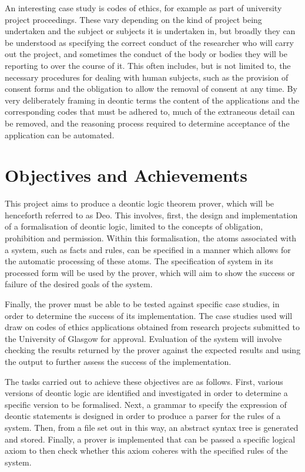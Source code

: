\documentclass{l4proj}
\begin{document}
An interesting case study is codes of ethics, for example as part of university project proceedings. These vary depending on the kind of project being undertaken and the subject or subjects it is undertaken in, but broadly they can be understood as specifying the correct conduct of the researcher who will carry out the project, and sometimes the conduct of the body or bodies they will be reporting to over the course of it. This often includes, but is not limited to, the necessary procedures for dealing with human subjects, such as the provision of consent forms and the obligation to allow the removal of consent at any time. By very deliberately framing in deontic terms the content of the applications and the corresponding codes that must be adhered to, much of the extraneous detail can be removed, and the reasoning process required to determine acceptance of the application can be automated.

\section{Objectives and Achievements} 
This project aims to produce a deontic logic theorem prover, which will be henceforth referred to as Deo. This involves, first, the design and implementation of a formalisation of deontic logic, limited to the concepts of obligation, prohibition and permission. Within this formalisation, the atoms associated with a system, such as facts and rules, can be specified in a manner which allows for the automatic processing of these atoms. The specification of system in its processed form will be used by the prover, which will aim to show the success or failure of the desired goals of the system. 

Finally, the prover must be able to be tested against specific case studies, in order to determine the success of its implementation. The case studies used will draw on codes of ethics applications obtained from research projects submitted to the University of Glasgow for approval. Evaluation of the system will involve checking the results returned by the prover against the expected results and using the output to further assess the success of the implementation. 

The tasks carried out to achieve these objectives are as follows. First, various versions of deontic logic are identified and investigated in order to determine a specific version to be formalised. Next, a grammar to specify the expression of deontic statements is designed in order to produce a parser for the rules of a system. Then, from a file set out in this way, an abstract syntax tree is generated and stored. Finally, a prover is implemented that can be passed a specific logical axiom to then check whether this axiom coheres with the specified rules of the system.
\end{document}
